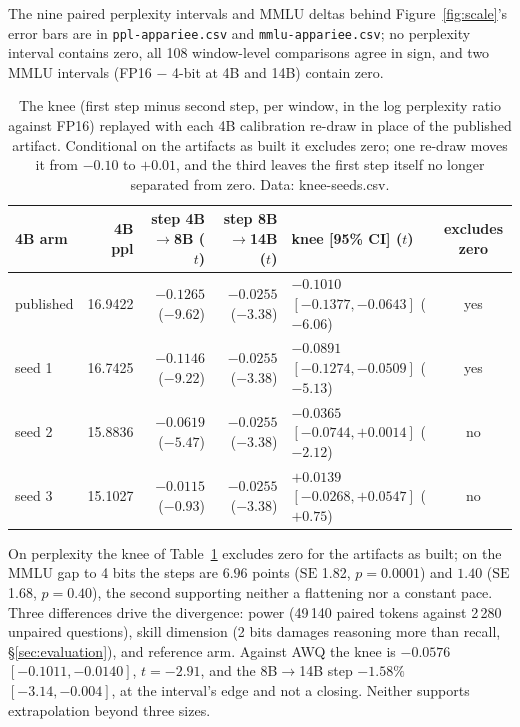 The nine paired perplexity intervals and MMLU deltas behind
Figure~\ref{fig:scale}'s error bars are in \texttt{ppl-appariee.csv} and
\texttt{mmlu-appariee.csv}; no perplexity interval contains zero, all 108
window-level comparisons agree in sign, and two MMLU intervals (FP16 $-$
4-bit at 4B and 14B) contain zero.

\begin{table}[htbp]
\centering
\footnotesize
\setlength{\tabcolsep}{4pt}
\begin{tabular}{lrrrlc}
\toprule
4B arm & 4B ppl & step 4B$\to$8B ($t$) & step 8B$\to$14B ($t$) & knee [95\% CI] ($t$) & excludes zero \\
\midrule
published & 16.9422 & $-0.1265$ ($-9.62$) & $-0.0255$ ($-3.38$) & $-0.1010$ $[-0.1377, -0.0643]$ ($-6.06$) & yes \\
seed 1    & 16.7425 & $-0.1146$ ($-9.22$) & $-0.0255$ ($-3.38$) & $-0.0891$ $[-0.1274, -0.0509]$ ($-5.13$) & yes \\
seed 2    & 15.8836 & $-0.0619$ ($-5.47$) & $-0.0255$ ($-3.38$) & $-0.0365$ $[-0.0744, +0.0014]$ ($-2.12$) & no \\
seed 3    & 15.1027 & $-0.0115$ ($-0.93$) & $-0.0255$ ($-3.38$) & $+0.0139$ $[-0.0268, +0.0547]$ ($+0.75$) & no \\
\bottomrule
\end{tabular}
\caption{The knee (first step minus second step, per window, in the log
perplexity ratio against FP16) replayed with each 4B calibration re-draw in
place of the published artifact. Conditional on the artifacts as built it
excludes zero; one re-draw moves it from $-0.10$ to $+0.01$, and the third
leaves the first step itself no longer separated from zero. Data:
knee-seeds.csv.}
\label{tab:seeds}
\end{table}

On perplexity the knee of Table~\ref{tab:seeds} excludes zero for the
artifacts as built; on the MMLU gap to 4 bits the steps are $6.96$ points
($\mathrm{SE}$ 1.82, $p = 0.0001$) and $1.40$ ($\mathrm{SE}$ 1.68,
$p = 0.40$), the second supporting neither a flattening nor a constant pace.
Three differences drive the divergence: power (49\,140 paired tokens against
2\,280 unpaired questions), skill dimension (2 bits damages reasoning more
than recall, \S\ref{sec:evaluation}), and reference arm. Against AWQ the
knee is $-0.0576$ $[-0.1011, -0.0140]$, $t = -2.91$, and the 8B$\to$14B step
$-1.58\%$ $[-3.14, -0.004]$, at the interval's edge and not a closing.
Neither supports extrapolation beyond three sizes.
